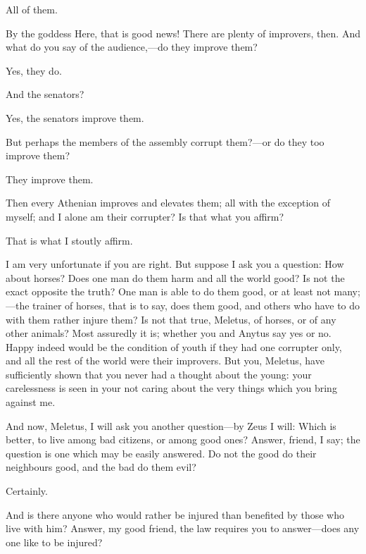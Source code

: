 \documentclass[11pt,letter]{article}
\begin{document}
\par  All of them.

\par  By the goddess Here, that is good news! There are plenty of improvers, then. And what do you say of the audience,—do they improve them?

\par  Yes, they do.

\par  And the senators?

\par  Yes, the senators improve them.

\par  But perhaps the members of the assembly corrupt them?—or do they too improve them?

\par  They improve them.

\par  Then every Athenian improves and elevates them; all with the exception of myself; and I alone am their corrupter? Is that what you affirm?

\par  That is what I stoutly affirm.

\par  I am very unfortunate if you are right. But suppose I ask you a question: How about horses? Does one man do them harm and all the world good? Is not the exact opposite the truth? One man is able to do them good, or at least not many;—the trainer of horses, that is to say, does them good, and others who have to do with them rather injure them? Is not that true, Meletus, of horses, or of any other animals? Most assuredly it is; whether you and Anytus say yes or no. Happy indeed would be the condition of youth if they had one corrupter only, and all the rest of the world were their improvers. But you, Meletus, have sufficiently shown that you never had a thought about the young: your carelessness is seen in your not caring about the very things which you bring against me.

\par  And now, Meletus, I will ask you another question—by Zeus I will: Which is better, to live among bad citizens, or among good ones? Answer, friend, I say; the question is one which may be easily answered. Do not the good do their neighbours good, and the bad do them evil?

\par  Certainly.

\par  And is there anyone who would rather be injured than benefited by those who live with him? Answer, my good friend, the law requires you to answer—does any one like to be injured?
\end{document}
